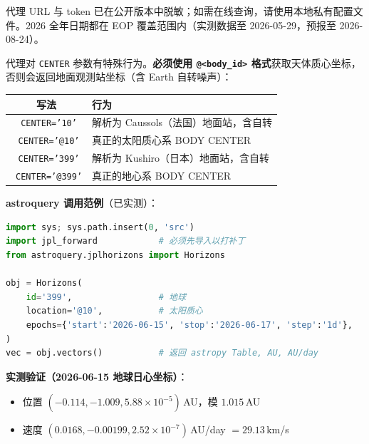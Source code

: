 \documentclass[11pt,a4paper]{ctexart}
\newcommand{\cmark}{\textcolor{green!55!black}{\ding{51}}}
\newcommand{\xmark}{\textcolor{warn}{\ding{55}}}
\begin{document}
\begin{notebox}[代理可用性]
代理 URL 与 token 已在公开版本中脱敏；如需在线查询，请使用本地私有配置文件。2026 全年日期都在 EOP 覆盖范围内（实测数据至 2026-05-29，预报至 2026-08-24）。
\end{notebox}

\begin{warnbox}
代理对 \texttt{CENTER} 参数有特殊行为。\textbf{必须使用 \texttt{@<body\_id>} 格式}获取天体质心坐标，否则会返回地面观测站坐标（含 Earth 自转噪声）：
\vspace{4pt}
\begin{center}
\small
\begin{tabular}{@{}cl@{}}
\toprule
写法 & 行为 \\
\midrule
\xmark\ \texttt{CENTER='10'}   & 解析为 Caussols（法国）地面站，含自转 \\
\cmark\ \texttt{CENTER='@10'}  & 真正的太阳质心系 BODY CENTER \\
\xmark\ \texttt{CENTER='399'}  & 解析为 Kushiro（日本）地面站，含自转 \\
\cmark\ \texttt{CENTER='@399'} & 真正的地心系 BODY CENTER \\
\bottomrule
\end{tabular}
\end{center}
\end{warnbox}

\textbf{astroquery 调用范例}（已实测）：

\begin{lstlisting}[language=Python]
import sys; sys.path.insert(0, 'src')
import jpl_forward            # 必须先导入以打补丁
from astroquery.jplhorizons import Horizons

obj = Horizons(
    id='399',                 # 地球
    location='@10',           # 太阳质心
    epochs={'start':'2026-06-15', 'stop':'2026-06-17', 'step':'1d'},
)
vec = obj.vectors()           # 返回 astropy Table, AU, AU/day
\end{lstlisting}

\textbf{实测验证（2026-06-15 地球日心坐标）}：

\begin{itemize}[leftmargin=*]
    \item 位置 $(-0.114, -1.009, 5.88\!\times\!10^{-5})$\,AU，模 $1.015$\,AU \cmark
    \item 速度 $(0.0168, -0.00199, 2.52\!\times\!10^{-7})$\,AU/day $=29.13$\,km/s \cmark
\end{itemize}
\end{document}

